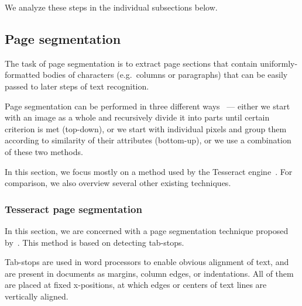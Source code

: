 We analyze these steps in the individual subsections below.

\subsection{Page segmentation} \label{pageSegmentation}

The task of page segmentation is to extract page sections that contain uniformly-formatted bodies of characters (e.g.~columns or paragraphs) that can be easily passed to later steps of text recognition.

Page segmentation can be performed in three different ways~\citep{segmentationOverview} --- either we start with an image as a whole and recursively divide it into parts until certain criterion is met (top-down), or we start with individual pixels and group them according to similarity of their attributes (bottom-up), or we use a combination of these two methods.

In this section, we focus mostly on a method used by the Tesseract engine~\cite{tesseractSegmentationTab}. For comparison, we also overview several other existing techniques.

\subsubsection{Tesseract page segmentation} \label{sectionTessPageSegm}

In this section, we are concerned with a page segmentation technique proposed by~\citet{tesseractSegmentationTab}. This method is based on detecting tab-stops.

Tab-stops are used in word processors to enable obvious alignment of text, and are present in documents as margins, column edges, or indentations. All of them are placed at fixed x-positions, at which edges or centers of text lines are vertically aligned.

